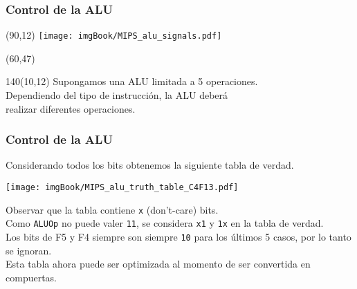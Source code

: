 \documentclass[aspectratio=169]{beamer}
\begin{document}
\begin{frame}[t,fragile]
    \frametitle{Control de la ALU}
    \begin{textblock}{80}(90,12)
    \texttt{[image: imgBook/MIPS\_alu\_signals.pdf]}
    \end{textblock}
    \begin{textblock}{80}(60,47)
    \end{textblock}
    \begin{textblock}{140}(10,12)
    \small
    Supongamos una ALU limitada a 5 operaciones.\\
    Dependiendo del tipo de instrucción, la ALU deberá\\ realizar diferentes operaciones.\\
    \bigskip
    \bigskip
    \end{textblock}
\end{frame}

\begin{frame}[t,fragile]
    \frametitle{Control de la ALU}
    Considerando todos los bits obtenemos la siguiente tabla de verdad.
    \begin{center}
    \texttt{[image: imgBook/MIPS\_alu\_truth\_table\_C4F13.pdf]}
    \end{center}
    \small
    \pause
    Observar que la tabla contiene \texttt{x} (don't-care) bits.\\
    Como \texttt{ALUOp} no puede valer \texttt{11}, se considera \texttt{x1} y \texttt{1x} en la tabla de verdad.\\
    Los bits de F5 y F4 siempre son siempre \texttt{10} para los últimos 5 casos, por lo tanto se ignoran.\\
    \bigskip
    \normalsize
    \textcolor{verdeuca}{Esta tabla ahora puede ser optimizada al momento de ser convertida en compuertas.}
\end{frame}
\end{document}
